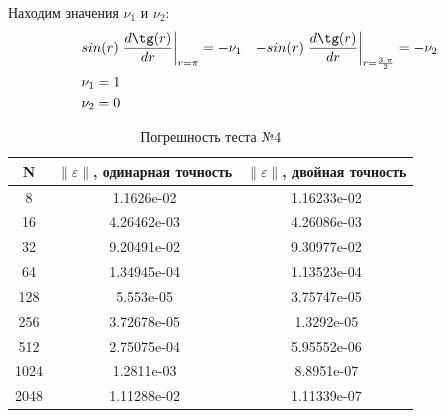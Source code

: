   Находим значения $ \nu_1 $ и $ \nu_2 $:
  \begin{align*}
		&sin(r) \left. \frac{d\tg(r)}{dr}\right\vert_{r = \pi} = -\nu _1
		&-sin(r) \left. \frac{d\tg(r)}{dr}\right\vert_{r = \frac{3 \cdot \pi}{2}} = -\nu_2 \\
    & \nu_1 = 1 \\
    &\nu_2 = 0
  \end{align*}
  \begin{table}[H]
    \centering
    \begin{tabular}{c | c | c}
      \toprule
      N & $ \left\lVert \varepsilon \right\rVert  $, одинарная точность & $ \left\lVert \varepsilon \right\rVert  $, двойная точность \\
      \midrule
      8 & 1.1626e-02 & 1.16233e-02\\
      16 & 4.26462e-03 & 4.26086e-03\\
      32 & 9.20491e-02 & 9.30977e-02\\
      64 & 1.34945e-04 & 1.13523e-04\\
      128 & 5.553e-05 & 3.75747e-05\\
      256 & 3.72678e-05 & 1.3292e-05\\
      512 & 2.75075e-04 & 5.95552e-06\\
      1024 & 1.2811e-03 & 8.8951e-07\\
      2048 & 1.11288e-02 & 1.11339e-07\\
      \bottomrule
    \end{tabular}
    \caption{Погрешность теста №4}
  \end{table}
